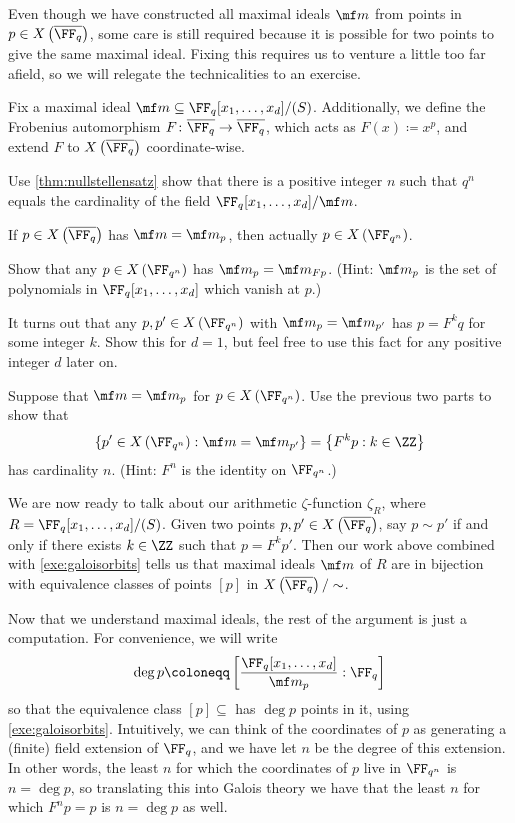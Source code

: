 \documentclass{article}
\begin{document}
Even though we have constructed all maximal ideals $\mf m$ from points in $p\in X\left(\overline{\FF_{q}}\right)$, some care is still required because it is possible for two points to give the same maximal ideal. Fixing this requires us to venture a little too far afield, so we will relegate the technicalities to an exercise.
\begin{exe} \label{exe:galoisorbits}
	Fix a maximal ideal $\mf m\subseteq\FF_q[x_1,\ldots,x_d]/(S)$. Additionally, we define the Frobenius automorphism $F\colon\overline{\FF_q}\to\overline{\FF_q}$, which acts as $F(x)\coloneqq x^p$, and extend $F$ to $X\left(\overline{\FF_q}\right)$ coordinate-wise.
	\begin{listalph}
		\item Use \autoref{thm:nullstellensatz} show that there is a positive integer $n$ such that $q^n$ equals the cardinality of the field $\FF_q[x_1,\ldots,x_d]/\mf m$.
		\item If $p\in X\left(\overline{\FF_q}\right)$ has $\mf m=\mf m_p$, then actually $p\in X\left(\FF_{q^n}\right)$.
		\item Show that any $p\in X\left({\FF_{q^n}}\right)$ has $\mf m_p=\mf m_{Fp}$. (Hint: $\mf m_p$ is the set of polynomials in $\FF_q[x_1,\ldots,x_d]$ which vanish at $p$.)
		\item It turns out that any $p,p'\in X\left({\FF_{q^n}}\right)$ with $\mf m_p=\mf m_{p'}$ has $p=F^kq$ for some integer $k$. Show this for $d=1$, but feel free to use this fact for any positive integer $d$ later on.
		\item Suppose that $\mf m=\mf m_p$ for $p\in X\left(\FF_{q^n}\right)$. Use the previous two parts to show that
		\[\left\{p'\in X\left(\FF_{q^n}\right):\mf m=\mf m_{p'}\right\}=\left\{F^kp:k\in\ZZ\right\}\]
		has cardinality $n$. (Hint: $F^n$ is the identity on $\FF_{q^n}$.)
	\end{listalph}
\end{exe}
We are now ready to talk about our arithmetic $\zeta$-function $\zeta_R$, where $R=\FF_q[x_1,\ldots,x_d]/(S)$. Given two points $p,p'\in X\left(\overline{\FF_q}\right)$, say $p\sim p'$ if and only if there exists $k\in\ZZ$ such that $p=F^kp'$. Then our work above combined with \autoref{exe:galoisorbits} tells us that maximal ideals $\mf m$ of $R$ are in bijection with equivalence classes of points $[p]$ in $X\left(\overline{\FF_q}\right)/\sim$.

Now that we understand maximal ideals, the rest of the argument is just a computation. For convenience, we will write
\[\deg p\coloneqq\left[\frac{\FF_q[x_1,\ldots,x_d]}{\mf m_p}:\FF_q\right]\]
so that the equivalence class $[p]\subseteq$ has $\deg p$ points in it, using \autoref{exe:galoisorbits}. Intuitively, we can think of the coordinates of $p$ as generating a (finite) field extension of $\FF_q$, and we have let $n$ be the degree of this extension. In other words, the least $n$ for which the coordinates of $p$ live in $\FF_{q^n}$ is $n=\deg p$, so translating this into Galois theory we have that the least $n$ for which $F^np=p$ is $n=\deg p$ as well.
\end{document}
